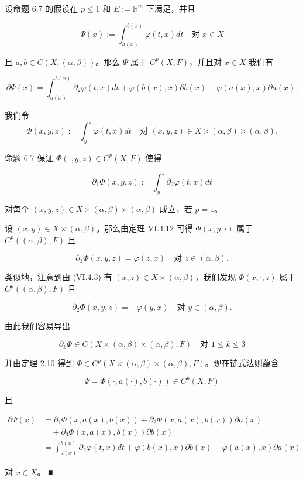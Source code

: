 \begin{corollary}

设命题 6.7 的假设在 $ p \le 1 $ 和 $ E := \mathbb{R}^{m} $ 下满足，并且

\[
\Psi(x) := \int_{a(x)}^{b(x)}\varphi(t, x) dt \quad \text{对 } x \in X
\]

且 $ a, b \in C(X, (\alpha, \beta)) $。那么 $ \Psi $ 属于 $ C^{p}(X, F) $，并且对 $ x \in X $ 我们有

\[
\partial\Psi(x) = \int_{a(x)}^{b(x)}\partial_{2}\varphi(t, x) dt + \varphi(b(x), x)\partial b(x) - \varphi(a(x), x)\partial a(x) .
\]

\proofhead
我们令
\[
\Phi(x, y, z) := \int_{y}^{z}\varphi(t, x) dt \quad \text{对 } (x, y, z) \in X \times (\alpha, \beta) \times (\alpha, \beta) .
\]

命题 6.7 保证 $ \Phi(\cdot, y, z) \in C^{p}(X, F) $ 使得

\[
\partial_{1}\Phi(x, y, z) := \int_{y}^{z}\partial_{2}\varphi(t, x) dt
\]

对每个 $ (x, y, z) \in X \times (\alpha, \beta) \times (\alpha, \beta) $ 成立，若 $ p = 1 $。

设 $ (x, y) \in X \times (\alpha, \beta) $。那么由定理 VI.4.12 可得 $ \Phi(x, y, \cdot) $ 属于 $ C^{p}((\alpha, \beta), F) $ 且

\[
\partial_{3}\Phi(x, y, z) = \varphi(z, x) \quad \text{对 } z \in (\alpha, \beta) .
\]

类似地，注意到由 (VI.4.3) 有 $ (x, z) \in X \times (\alpha, \beta) $，我们发现 $ \Phi(x, \cdot, z) $ 属于 $ C^{p}((\alpha, \beta), F) $ 且

\[
\partial_{2}\Phi(x, y, z) = -\varphi(y, x) \quad \text{对 } y \in (\alpha, \beta) .
\]

由此我们容易导出

\[
\partial_{k}\Phi \in C(X \times (\alpha, \beta) \times (\alpha, \beta), F) \quad \text{对 } 1 \le k \le 3
\]

并由定理 2.10 得到 $ \Phi \in C^{p}(X \times (\alpha, \beta) \times (\alpha, \beta), F) $。现在链式法则蕴含

\[
\Psi = \Phi(\cdot, a(\cdot), b(\cdot)) \in C^{p}(X, F)
\]

且

\begin{equation*}
\begin{aligned}
\partial\Psi(x) &= \partial_{1}\Phi(x, a(x), b(x)) + \partial_{2}\Phi(x, a(x), b(x))\partial a(x) \\ &\quad + \partial_{3}\Phi(x, a(x), b(x))\partial b(x) \\ &= \int_{a(x)}^{b(x)}\partial_{2}\varphi(t, x) dt + \varphi(b(x), x)\partial b(x) - \varphi(a(x), x)\partial a(x)
\end{aligned}
\end{equation*}

对 $ x \in X $。 \nobreak\hspace{0.35em}■

\end{corollary}

